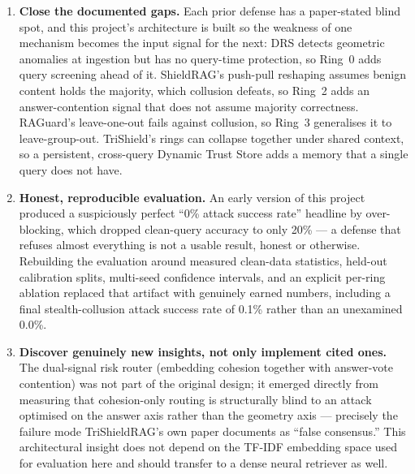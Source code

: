 \begin{enumerate}
\item \textbf{Close the documented gaps.} Each prior defense has a
  paper-stated blind spot, and this project's architecture is built so
  the weakness of one mechanism becomes the input signal for the next:
  DRS detects geometric anomalies at ingestion but has no query-time
  protection, so Ring~0 adds query screening ahead of it. ShieldRAG's
  push-pull reshaping assumes benign content holds the majority, which
  collusion defeats, so Ring~2 adds an answer-contention signal that does
  not assume majority correctness. RAGuard's leave-one-out fails against
  collusion, so Ring~3 generalises it to leave-group-out. TriShield's
  rings can collapse together under shared context, so a persistent,
  cross-query Dynamic Trust Store adds a memory that a single query does
  not have.

\item \textbf{Honest, reproducible evaluation.} An early version of this
  project produced a suspiciously perfect ``0\% attack success rate''
  headline by over-blocking, which dropped clean-query accuracy to only
  20\% --- a defense that refuses almost everything is not a usable
  result, honest or otherwise. Rebuilding the evaluation around measured
  clean-data statistics, held-out calibration splits, multi-seed
  confidence intervals, and an explicit per-ring ablation replaced that
  artifact with genuinely earned numbers, including a final
  stealth-collusion attack success rate of 0.1\% rather than an
  unexamined 0.0\%.

\item \textbf{Discover genuinely new insights, not only implement cited
  ones.} The dual-signal risk router (embedding cohesion together with
  answer-vote contention) was not part of the original design; it
  emerged directly from measuring that cohesion-only routing is
  structurally blind to an attack optimised on the answer axis rather
  than the geometry axis --- precisely the failure mode TriShieldRAG's
  own paper documents as ``false consensus.'' This architectural insight
  does not depend on the TF-IDF embedding space used for evaluation here
  and should transfer to a dense neural retriever as well.
\end{enumerate}

